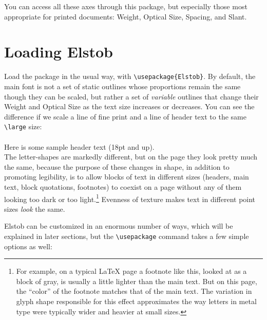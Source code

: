 \documentclass[12pt]{article}
\begin{document}
\noindent You can access all these axes through this package, but
especially those most appropriate for printed documents: Weight, Optical Size,
Spacing, and Slant.


\section{Loading Elstob}

Load the package in the usual way, with {\verb|\usepackage{Elstob}|}.
By default, the main font is not a set of static outlines whose proportions
remain the same though they can be scaled, but rather a set of
\emph{variable} outlines that change their Weight and Optical Size as the text size increases
or decreases. You can see the difference if we scale a line of fine print
and a line of header text to the same {\verb|\large|} size:\\[0.5ex]

\\[0.2ex]
{\large\sampleheader Here is some sample header text (18pt and up).}\\[0.5ex]

\noindent The letter-shapes are markedly different, but on the page they look
pretty much the same, because the purpose of these changes in
shape, in addition to promoting legibility,
is to allow blocks of text in different sizes (headers, main text,
block quotations, footnotes) to coexist on a page without any of them looking too
dark or too light.\footnote{%
For example, on a typical LaTeX page a footnote like this, looked at as a block
of gray, is usually a little lighter than the main text. But on this page, the
“color” of the footnote matches that of the main text. The variation in glyph
shape responsible for this effect approximates the way letters in metal type were
typically wider and heavier at small sizes.} Evenness of texture makes text in
different point sizes \emph{look} the same.

Elstob can be customized in an enormous number of ways, which will be explained
in later sections, but the {\verb|\usepackage|} command takes a few simple options
as well:
\end{document}
